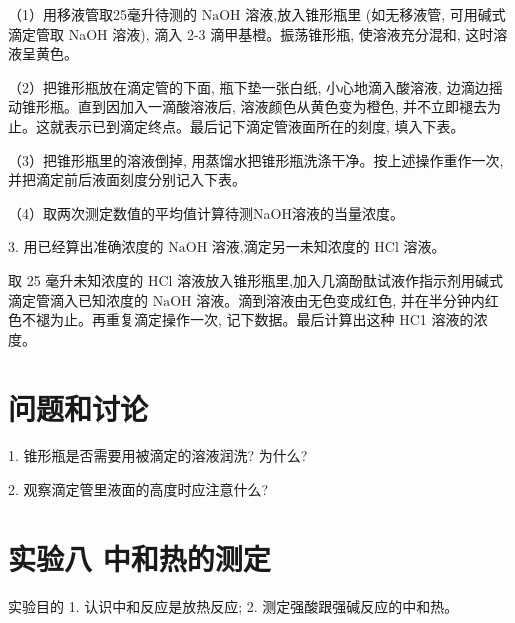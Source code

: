 \documentclass[10pt]{article}
\begin{document}
（1）用移液管取25毫升待测的 \(\mathrm{{NaOH}}\) 溶液,放入锥形瓶里 (如无移液管, 可用碱式滴定管取 NaOH 溶液), 滴入 2-3 滴甲基橙。振荡锥形瓶, 使溶液充分混和, 这时溶液呈黄色。

（2）把锥形瓶放在滴定管的下面, 瓶下垫一张白纸, 小心地滴入酸溶液, 边滴边摇动锥形瓶。直到因加入一滴酸溶液后, 溶液颜色从黄色变为橙色, 并不立即褪去为止。这就表示已到滴定终点。最后记下滴定管液面所在的刻度, 填入下表。

（3）把锥形瓶里的溶液倒掉, 用蒸馏水把锥形瓶洗涤干净。按上述操作重作一次, 并把滴定前后液面刻度分别记入下表。

\begin{center}
\end{center}

（4）取两次测定数值的平均值计算待测NaOH溶液的当量浓度。

3. 用已经算出准确浓度的 \(\mathrm{{NaOH}}\) 溶液,滴定另一未知浓度的 \(\mathrm{{HCl}}\) 溶液。

取 25 毫升未知浓度的 \(\mathrm{{HCl}}\) 溶液放入锥形瓶里,加入几滴酚酞试液作指示剂用碱式滴定管滴入已知浓度的 \(\mathrm{{NaOH}}\) 溶液。滴到溶液由无色变成红色, 并在半分钟内红色不褪为止。再重复滴定操作一次, 记下数据。最后计算出这种 HC1 溶液的浓度。

\section*{问题和讨论}

1. 锥形瓶是否需要用被滴定的溶液润洗? 为什么?

2. 观察滴定管里液面的高度时应注意什么?

\section*{实验八 中和热的测定}

实验目的 1. 认识中和反应是放热反应; 2. 测定强酸跟强碱反应的中和热。
\end{document}

